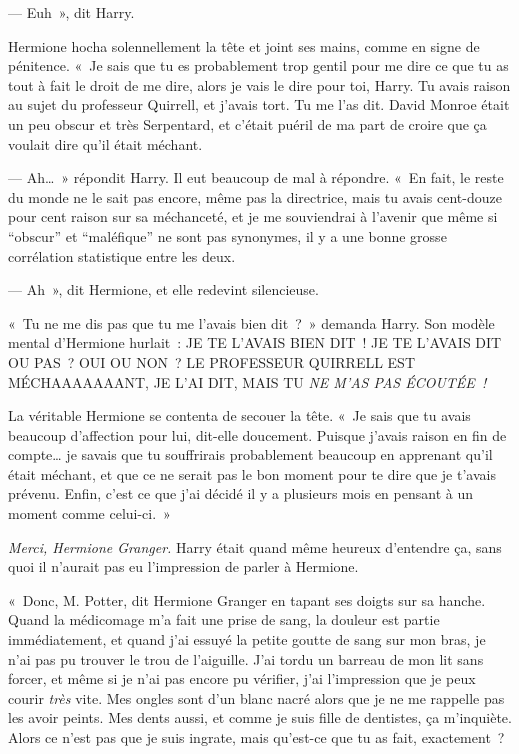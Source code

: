 --- Euh~», dit Harry.

Hermione hocha solennellement la tête et joint ses mains, comme en signe de pénitence. «~Je sais que tu es probablement trop gentil pour me dire ce que tu as tout à fait le droit de me dire, alors je vais le dire pour toi, Harry. Tu avais raison au sujet du professeur Quirrell, et j'avais tort. Tu me l'as dit. David Monroe était un peu obscur et très Serpentard, et c'était puéril de ma part de croire que ça voulait dire qu'il était méchant.

--- Ah…~» répondit Harry. Il eut beaucoup de mal à répondre. «~En fait, le reste du monde ne le sait pas encore, même pas la directrice, mais tu avais cent-douze pour cent raison sur sa méchanceté, et je me souviendrai à l'avenir que même si “obscur” et “maléfique” ne sont pas synonymes, il y a une bonne grosse corrélation statistique entre les deux.

--- Ah~», dit Hermione, et elle redevint silencieuse.

«~Tu ne me dis pas que tu me l'avais bien dit~?~» demanda Harry. Son modèle mental d'Hermione hurlait~: JE TE L'AVAIS BIEN DIT~! JE TE L'AVAIS DIT OU PAS~? OUI OU NON~? LE PROFESSEUR QUIRRELL EST MÉCHAAAAAAANT, JE L'AI DIT, MAIS TU \emph{NE M'AS PAS ÉCOUTÉE~!}

La véritable Hermione se contenta de secouer la tête. «~Je sais que tu avais beaucoup d'affection pour lui, dit-elle doucement. Puisque j'avais raison en fin de compte… je savais que tu souffrirais probablement beaucoup en apprenant qu'il était méchant, et que ce ne serait pas le bon moment pour te dire que je t'avais prévenu. Enfin, c'est ce que j'ai décidé il y a plusieurs mois en pensant à un moment comme celui-ci.~»

\emph{Merci, Hermione Granger.} Harry était quand même heureux d'entendre ça, sans quoi il n'aurait pas eu l'impression de parler à Hermione.

«~Donc, M. Potter, dit Hermione Granger en tapant ses doigts sur sa hanche. Quand la médicomage m'a fait une prise de sang, la douleur est partie immédiatement, et quand j'ai essuyé la petite goutte de sang sur mon bras, je n'ai pas pu trouver le trou de l'aiguille. J'ai tordu un barreau de mon lit sans forcer, et même si je n'ai pas encore pu vérifier, j'ai l'impression que je peux courir \emph{très} vite. Mes ongles sont d'un blanc nacré alors que je ne me rappelle pas les avoir peints. Mes dents aussi, et comme je suis fille de dentistes, ça m'inquiète. Alors ce n'est pas que je suis ingrate, mais qu'est-ce que tu as fait, exactement~?

